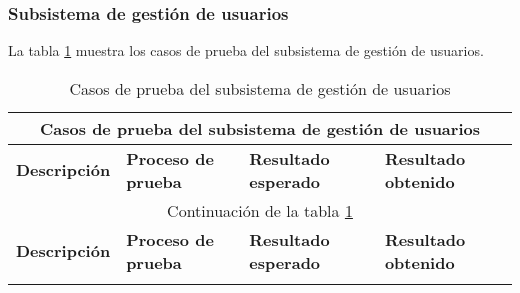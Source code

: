 
\subsubsection{Subsistema de gestión de usuarios}
La tabla \ref{table:casos_prueba_usuarios} muestra los casos de prueba del subsistema de gestión de usuarios.


\begin{landscape}
	\begin{longtable}[c]{|p{50mm}|p{50mm}|p{50mm}|p{50mm}|}
	 \caption{Casos de prueba del subsistema de gestión de usuarios\label{table:casos_prueba_usuarios}}\\
	
	 \hline
	 \multicolumn{4}{|c|}{\textbf{Casos de prueba del subsistema de gestión de usuarios}}\\
	 \hline
	 \textbf{Descripción} & \textbf{Proceso de prueba} & \textbf{Resultado esperado} & \textbf{Resultado obtenido}\\
	 \hline
	 \hline
	 \endfirsthead
	 
	 \hline
	 \multicolumn{4}{|c|}{Continuación de la tabla \ref{table:casos_prueba_usuarios}}\\
	 \hline
	 \textbf{Descripción} & \textbf{Proceso de prueba} & \textbf{Resultado esperado} & \textbf{Resultado obtenido}\\
	 \hline
	 \hline
	 \endhead
	 
	 \hline
	 \endfoot
	 

\end{longtable}
\end{landscape}
